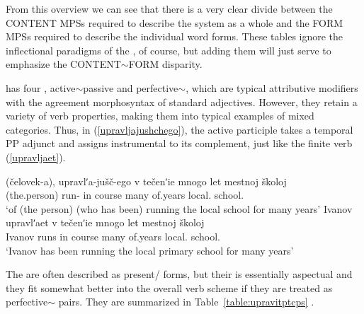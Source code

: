 \documentclass[output=paper,
modfonts
]{LSP/langsci}
\begin{document}
\largerpage
From this overview we can see that there is a very clear divide between the CONTENT  MPSs required to describe the system as a whole and the FORM  MPSs required to describe the individual word forms. These tables ignore the inflectional paradigms of the , of course, but adding them will just serve to emphasize the CONTENT$\sim$FORM disparity.

 has four , active$\sim$passive and perfective$\sim$, which are typical attributive modifiers with the agreement morphosyntax of standard adjectives. %
However, they retain a variety of verb properties, making them into typical examples of mixed categories. Thus, in  (\ref{upravljajushchego}),  the  active participle   takes a temporal PP adjunct and assigns instrumental  to its complement, just like the finite verb (\ref{upravljaet}).

\begin{exe}	\ex	\label{upravljajushchij}
	\begin{xlist}
\ex	\label{upravljajushchego}\gll	(čelovek-a), upravlʹa-jušč-ego v tečenʹie mnogo let mestnoj školoj\\
		(the.person) run-	in course many of.years local.  school.\\
\glt		‘of (the person) (who has been) running the local  school for many years’
\ex	\label{upravljaet}\gll	Ivanov upravlʹaet v tečenʹie mnogo let mestnoj  školoj\\
		Ivanov runs	in course many of.years local.  school.\\
\glt		‘Ivanov has been running the local primary school for many years’
	\end{xlist}
\end{exe}

The  are often described as present/ forms, but their  is essentially aspectual and they fit somewhat better into the overall verb scheme if they are treated as perfective$\sim$ pairs. They are summarized in Table~\ref{table:upravitptcps} \parencite[cf][361]{Wade92:book}.
\end{document}
